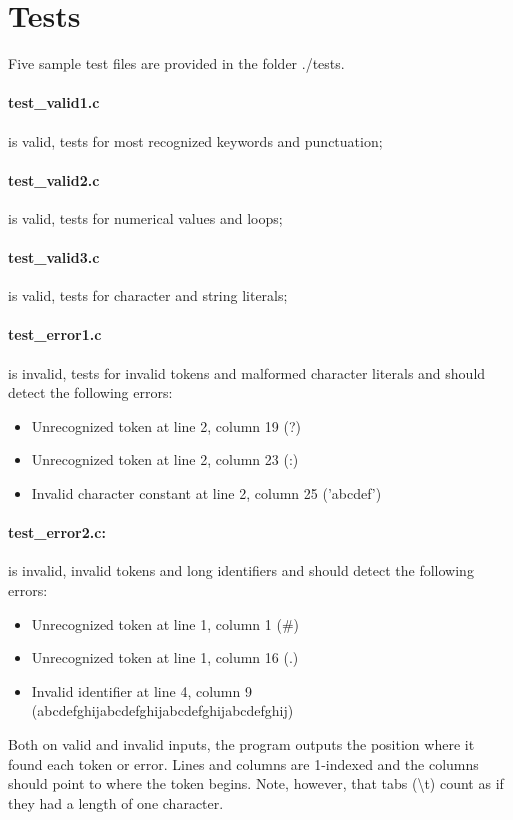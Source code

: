 \documentclass[12pt]{article}
\begin{document}
\section{Tests}
Five sample test files are provided in the folder ./tests.

\paragraph{test{\_}valid1.c} is valid, tests for most recognized keywords and punctuation;
\paragraph{test{\_}valid2.c} is valid, tests for numerical values and loops;
\paragraph{test{\_}valid3.c} is valid, tests for character and string literals;
\paragraph{test{\_}error1.c} is invalid, tests for invalid tokens and malformed character literals
and should detect the following errors:
\begin{itemize}
\item Unrecognized token at line 2, column 19 (?)
\item Unrecognized token at line 2, column 23 (:)
\item Invalid character constant at line 2, column 25 ('abcdef')
\end{itemize}

\paragraph{test{\_}error2.c:} is invalid, invalid tokens and long identifiers and  should
detect the following errors:
\begin{itemize}
\item Unrecognized token at line 1, column 1  (\#)
\item Unrecognized token at line 1, column 16 (.)
\item Invalid identifier at line 4, column 9  (abcdefghijabcdefghijabcdefghijabcdefghij)
\end{itemize}

Both on valid and invalid inputs, the program outputs the position where it found each token or
error. Lines and columns are 1-indexed and the columns should point to where the token begins.
Note, however, that tabs (\textbackslash t) count as if they had a length of one character.


\printbibliography
\end{document}
